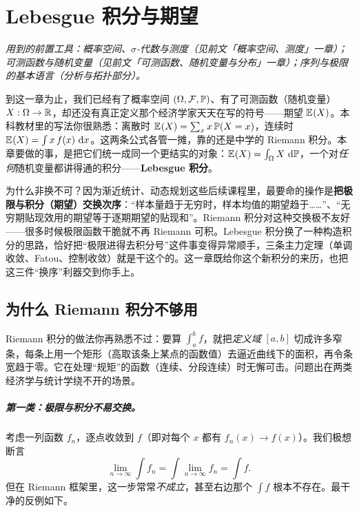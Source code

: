 \chapter{Lebesgue 积分与期望}
\label{ch:lebesgue}

\noindent\emph{用到的前置工具：概率空间、$\sigma$-代数与测度（见前文「概率空间、测度」一章）；可测函数与随机变量（见前文「可测函数、随机变量与分布」一章）；序列与极限的基本语言（分析与拓扑部分）。}
\medskip

到这一章为止，我们已经有了概率空间 $(\Omega,\mathcal{F},\mathbb{P})$、有了可测函数（随机变量）$X:\Omega\to\mathbb{R}$，却还没有真正定义那个经济学家天天在写的符号——期望 $\mathbb{E}_{}\!\left(X\right)$。本科教材里的写法你很熟悉：离散时 $\mathbb{E}_{}\!\left(X\right)=\sum_x x\,\mathbb{P}\!\left(X=x\right)$，连续时 $\mathbb{E}_{}\!\left(X\right)=\int x\,f(x)\,\mathop{}\!\mathrm{d} x$。这两条公式各管一摊，靠的还是中学的 Riemann 积分。本章要做的事，是把它们统一成同一个更结实的对象：$\mathbb{E}_{}\!\left(X\right)=\int_\Omega X\,\mathop{}\!\mathrm{d}\mathbb{P}$，一个对\emph{任何}随机变量都讲得通的积分——\textbf{Lebesgue 积分}。

为什么非换不可？因为渐近统计、动态规划这些后续课程里，最要命的操作是\textbf{把极限与积分（期望）交换次序}：``样本量趋于无穷时，样本均值的期望趋于……''、``无穷期贴现效用的期望等于逐期期望的贴现和''。Riemann 积分对这种交换极不友好——很多时候极限函数干脆就不再 Riemann 可积。Lebesgue 积分换了一种构造积分的思路，恰好把``极限进得去积分号''这件事变得异常顺手，三条主力定理（单调收敛、Fatou、控制收敛）就是干这个的。这一章既给你这个新积分的来历，也把这三件``换序''利器交到你手上。

\section{为什么 Riemann 积分不够用}
\label{sec:lebesgue-1}

Riemann 积分的做法你再熟悉不过：要算 $\int_a^b f$，就把\emph{定义域} $[a,b]$ 切成许多窄条，每条上用一个矩形（高取该条上某点的函数值）去逼近曲线下的面积，再令条宽趋于零。它在处理``规矩''的函数（连续、分段连续）时无懈可击。问题出在两类经济学与统计学绕不开的场景。

\paragraph{第一类：极限与积分不易交换。}
考虑一列函数 $f_n$，逐点收敛到 $f$（即对每个 $x$ 都有 $f_n(x)\to f(x)$）。我们极想断言
\[
    \lim_{n\to\infty}\int f_n=\int \lim_{n\to\infty} f_n=\int f .
\]
但在 Riemann 框架里，这一步常常\emph{不成立}，甚至右边那个 $\int f$ 根本不存在。最干净的反例如下。


